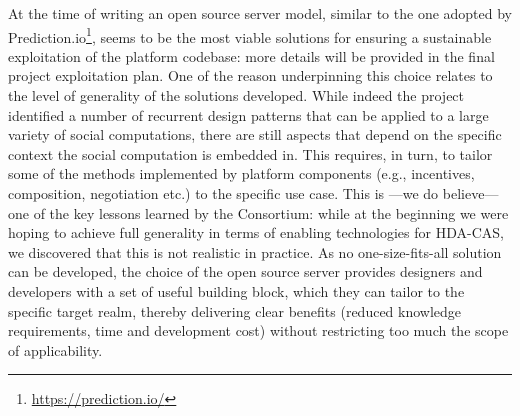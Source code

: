 At the time of writing an open source server model, similar to the one adopted by Prediction.io\footnote{\url{https://prediction.io/}}, seems to be the most viable solutions for ensuring a sustainable exploitation of the platform codebase: more details will be provided in the final project exploitation plan. One of the reason underpinning this choice relates to the level of generality of the solutions developed. While indeed the project identified a number of recurrent design patterns that can be applied to a large variety of social computations, there are still aspects that depend on the specific context the social computation is embedded in. This requires, in turn, to tailor some of the methods implemented by platform components (e.g., incentives, composition, negotiation etc.) to the specific use case. This is ---we do believe--- one of the key lessons learned by the Consortium: while at the beginning we were hoping to achieve full generality in terms of enabling technologies for HDA-CAS, we discovered that this is not realistic in practice. As no one-size-fits-all solution can be developed, the choice of the open source server provides designers and developers with a set of useful building block, which they can tailor to the specific target realm, thereby delivering clear benefits (reduced knowledge requirements, time and development cost) without restricting too much the scope of applicability. 




